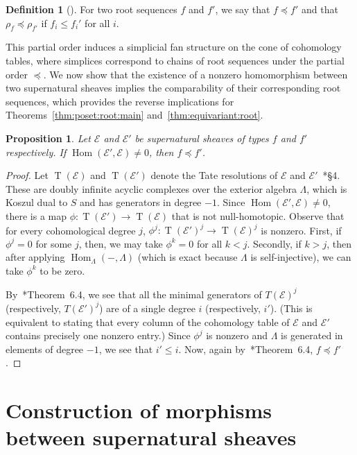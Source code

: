 \documentclass[12pt]{amsart}
\newtheorem{prop}[equation]{Proposition}
\theoremstyle{definition}
\newtheorem{defn}[equation]{Definition}
\newenvironment{definition}[1][]{\begin{defn}[#1]\pushQED{\qed}}{\popQED \end{defn}}
\newcommand{\Hom}{\operatorname{Hom}}
\newcommand{\EE}{\mathcal{E}}
\DeclareMathOperator{\tate}{T}
\begin{document}
\begin{definition}\label{defn:partial:root}
For two root sequences $f$ and $f'$, we say that $f\preceq f'$ and that
$\rho_f \preceq \rho_{f'}$ if $f_i\leq f_i'$ for all $i$.
\end{definition}

This partial order induces a simplicial fan structure on the cone of cohomology
tables, where simplices correspond to chains of root sequences under the partial
order $\preceq$.
We now
show that the existence of a nonzero homomorphism between two
supernatural sheaves implies the comparability of their corresponding
root sequences, which provides the reverse implications for
Theorems~\ref{thm:poset:root:main} and~\ref{thm:equivariant:root}.

\begin{prop}\label{prop:half:poset:root}
Let $\EE$ and $\EE'$ be supernatural sheaves of types $f$ and $f'$ 
respectively.  If $\Hom(\EE',\EE)\ne 0$, then $f\preceq f'$. 
\end{prop}
%
\begin{proof}
  Let $\tate(\EE)$ and $\tate(\EE')$ denote the Tate resolutions of
  $\EE$ and $\EE'$~\cite{EiFlScExterior03}*{\S4}.  These are doubly
  infinite acyclic complexes over the exterior algebra $\Lambda$,
  which is Koszul dual to $S$ and has generators in degree $-1$.
  Since $\Hom(\EE',\EE)\ne 0$, there is a map $\phi\colon \tate(\EE')
  \to \tate(\EE)$ that is not null-homotopic.  Observe that for every
  cohomological degree $j$, $\phi^j \colon \tate(\EE')^j \to
  \tate(\EE)^j$ is nonzero.  First, if $\phi^j=0$ for some $j$, then,
  we may take $\phi^k=0$ for all $k < j$. Secondly, if $k > j$, then
  after applying $\Hom_{\Lambda}(-, \Lambda)$ (which is exact because
  $\Lambda$ is self-injective), we can take $\phi^k$ to be zero.

By~\cite{EiScConjOfBS07}*{Theorem~6.4}, we see that all the minimal
generators of $T(\EE)^j$ (respectively, $T(\EE')^j$) are of a single degree
$i$ (respectively, $i'$). (This is equivalent to stating that every
column of the cohomology table of $\EE$ and $\EE'$ contains precisely one
nonzero entry.) Since $\phi^j$ is nonzero and $\Lambda$ is generated in
elements of degree $-1$, we see that $i' \leq i$. Now,  again
by~\cite{EiScConjOfBS07}*{Theorem~6.4},  $f \preceq f'$.
\end{proof}

\section{Construction of morphisms between supernatural sheaves}%
\label{sec:construct root}
\end{document}
